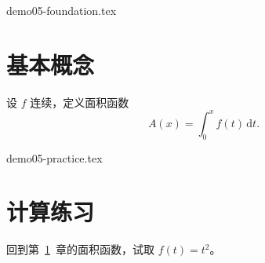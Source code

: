 \begin{filecontents*}{demo05-foundation.tex}
\chapter{基本概念}\label{ch:foundation}
设 \(f\) 连续，定义面积函数
\[
  A(x)=\int_0^x f(t)\,\mathrm{d}t.
\]
\end{filecontents*}
\begin{filecontents*}{demo05-practice.tex}
\chapter{计算练习}
回到第~\ref{ch:foundation}~章的面积函数，试取 \(f(t)=t^2\)。
\end{filecontents*}

\documentclass[UTF8,11pt,openany,oneside,linespread=1]{ctexbook}
\usepackage[margin=26mm]{geometry}
\usepackage{amsmath,xcolor}
\usepackage{setspace}
\usepackage[unicode,colorlinks=true,linkcolor=teal]{hyperref}

\tableofcontents



